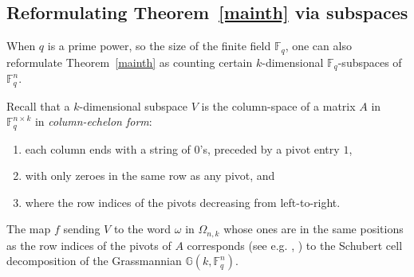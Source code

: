 \documentclass[10pt]{amsart}
\theoremstyle{plain}
\theoremstyle{definition}
\theoremstyle{remark}
\numberwithin{equation}{section}
\newcommand\FF{\mathbb{F}}
\newcommand\GG{\mathbb{G}}
\begin{document}
\subsection{Reformulating Theorem~\ref{mainth}
via subspaces}
When $q$ is a prime power, so the size of the finite field $\FF_q$,
one can also reformulate Theorem~\ref{mainth}
as counting certain $k$-dimensional $\FF_q$-subspaces of $\FF_q^n$.  

Recall that a $k$-dimensional subspace $V$ is the column-space of a 
matrix $A$ in $\FF_q^{n \times k}$ in {\it column-echelon form}:
\begin{enumerate}
\item[$\bullet$]
each column ends with a string of $0$'s, preceded by a pivot entry $1$, 
\item[$\bullet$]
with only zeroes in the same row as any pivot, and 
\item[$\bullet$]
where the row indices of the pivots decreasing
from left-to-right.
\end{enumerate}
The map $f$ sending $V$ to the word
$\omega$ in $\Omega_{n,k}$ whose ones are in the same positions
as the row indices of the pivots of $A$ corresponds (see e.g.
\cite{NSW}, \cite[Chapter 1]{Stanley}) to the Schubert
cell decomposition of the Grassmannian $\GG(k,\FF_q^n)$.
\end{document}
